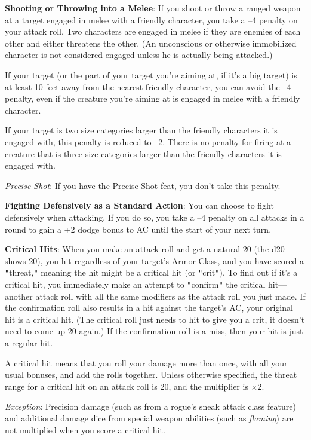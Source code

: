 \textbf{Shooting or Throwing into a Melee}: If you shoot or throw a ranged weapon at a target engaged in melee with a friendly character, you take a --4 penalty on your attack roll. Two characters are engaged in melee if they are enemies of each other and either threatens the other. (An unconscious or otherwise immobilized character is not considered engaged unless he is actually being attacked.)
				
If your target (or the part of your target you're aiming at, if it's a big target) is at least 10 feet away from the nearest friendly character, you can avoid the --4 penalty, even if the creature you're aiming at is engaged in melee with a friendly character. 
				
If your target is two size categories larger than the friendly characters it is engaged with, this penalty is reduced to --2. There is no penalty for firing at a creature that is three size categories larger than the friendly characters it is engaged with.
				
\textit{Precise Shot}: If you have the Precise Shot feat, you don't take this penalty.
				
\textbf{Fighting Defensively as a Standard Action}: You can choose to fight defensively when attacking. If you do so, you take a --4 penalty on all attacks in a round to gain a +2 dodge bonus to AC until the start of your next turn.
				
\textbf{Critical Hits}: When you make an attack roll and get a natural 20 (the d20 shows 20), you hit regardless of your target's Armor Class, and you have scored a \texttt{{}"{}}threat,\texttt{{}"{}} meaning the hit might be a critical hit (or \texttt{{}"{}}crit\texttt{{}"{}}). To find out if it's a critical hit, you immediately make an attempt to \texttt{{}"{}}confirm\texttt{{}"{}} the critical hit---another attack roll with all the same modifiers as the attack roll you just made. If the confirmation roll also results in a hit against the target's AC, your original hit is a critical hit. (The critical roll just needs to hit to give you a crit, it doesn't need to come up 20 again.) If the confirmation roll is a miss, then your hit is just a regular hit.
				
A critical hit means that you roll your damage more than once, with all your usual bonuses, and add the rolls together. Unless otherwise specified, the threat range for a critical hit on an attack roll is 20, and the multiplier is \mbox{$\times$}2.
				
\textit{Exception}: Precision damage (such as from a rogue's sneak attack class feature) and additional damage dice from special weapon abilities (such as \textit{flaming}) are not multiplied when you score a critical hit.
				
